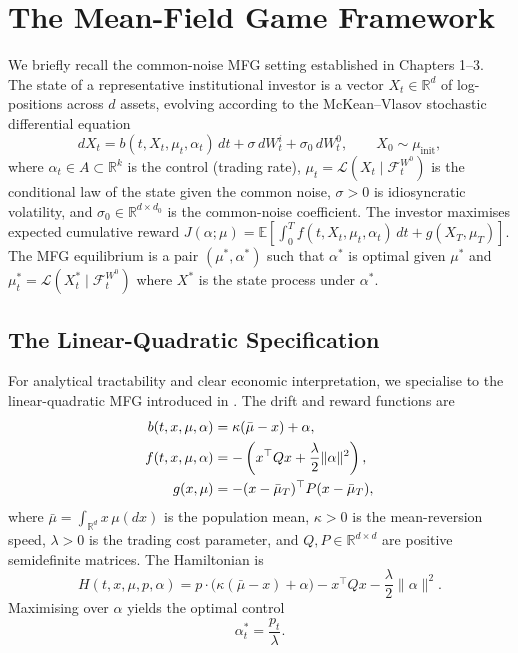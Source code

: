 \section{The Mean-Field Game Framework}
\label{sec:alpha-mfg-framework}

We briefly recall the common-noise MFG setting established in Chapters 1--3. The
state of a representative institutional investor is a vector $X_t \in \mathbb{R}^d$
of log-positions across $d$ assets, evolving according to the McKean--Vlasov
stochastic differential equation
\[
    dX_t = b(t,X_t,\mu_t,\alpha_t)\, dt + \sigma\, dW_t^i + \sigma_0\, dW_t^0, \qquad
    X_0 \sim \mu_{\mathrm{init}},
\]
where $\alpha_t \in A \subset \mathbb{R}^k$ is the control (trading rate),
$\mu_t = \mathcal{L}(X_t \mid \mathcal{F}_t^{W^0})$ is the conditional law of the
state given the common noise, $\sigma > 0$ is idiosyncratic volatility, and
$\sigma_0 \in \mathbb{R}^{d \times d_0}$ is the common-noise coefficient. The
investor maximises expected cumulative reward
$J(\alpha;\mu) = \mathbb{E}[\int_0^T f(t,X_t,\mu_t,\alpha_t)\, dt + g(X_T,\mu_T)]$.
The MFG equilibrium is a pair $(\mu^*, \alpha^*)$ such that $\alpha^*$ is optimal
given $\mu^*$ and $\mu_t^* = \mathcal{L}(X_t^* \mid \mathcal{F}_t^{W^0})$ where $X^*$
is the state process under $\alpha^*$.

\subsection{The Linear-Quadratic Specification}

For analytical tractability and clear economic interpretation, we specialise to the
linear-quadratic MFG introduced in . The drift and reward functions
are
\begin{align}
    b(t,x,\mu,\alpha) &= \kappa(\bar\mu - x) + \alpha, \notag\\
    f(t,x,\mu,\alpha) &= -\left( x^\top Q x + \frac{\lambda}{2}\|\alpha\|^2 \right), \notag\\
    g(x,\mu) &= -(x-\bar\mu_T)^\top P (x - \bar\mu_T),
    \label{eq:alpha-lq-specification}
\end{align}
where $\bar\mu = \int_{\mathbb{R}^d} x\, \mu(dx)$ is the population mean,
$\kappa > 0$ is the mean-reversion speed, $\lambda > 0$ is the trading cost
parameter, and $Q, P \in \mathbb{R}^{d \times d}$ are positive semidefinite matrices.
The Hamiltonian is
\[
    H(t,x,\mu,p,\alpha) = p \cdot \big(\kappa(\bar\mu-x) + \alpha\big) - x^\top Qx -
    \frac{\lambda}{2}\|\alpha\|^2.
\]
Maximising over $\alpha$ yields the optimal control
\begin{equation}
    \alpha_t^* = \frac{p_t}{\lambda}.
    \label{eq:alpha-optimal-control}
\end{equation}

